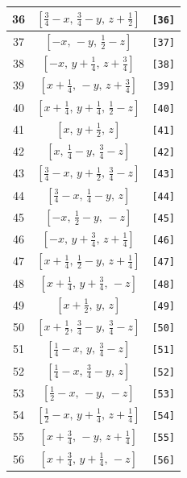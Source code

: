\documentclass[fleqn,8pt]{jsarticle}
\begin{document}
\begin{longtable}{ccc}
36 & $\left[ \frac{3}{4} - x,\, \frac{3}{4} - y,\, z + \frac{1}{2} \right]$ & {\tt [36]} \\ \hline
37 & $\left[ - x,\, - y,\, \frac{1}{2} - z \right]$ & {\tt [37]} \\ \hline
38 & $\left[ - x,\, y + \frac{1}{4},\, z + \frac{3}{4} \right]$ & {\tt [38]} \\ \hline
39 & $\left[ x + \frac{1}{4},\, - y,\, z + \frac{3}{4} \right]$ & {\tt [39]} \\ \hline
40 & $\left[ x + \frac{1}{4},\, y + \frac{1}{4},\, \frac{1}{2} - z \right]$ & {\tt [40]} \\ \hline
41 & $\left[ x,\, y + \frac{1}{2},\, z \right]$ & {\tt [41]} \\ \hline
42 & $\left[ x,\, \frac{1}{4} - y,\, \frac{3}{4} - z \right]$ & {\tt [42]} \\ \hline
43 & $\left[ \frac{3}{4} - x,\, y + \frac{1}{2},\, \frac{3}{4} - z \right]$ & {\tt [43]} \\ \hline
44 & $\left[ \frac{3}{4} - x,\, \frac{1}{4} - y,\, z \right]$ & {\tt [44]} \\ \hline
45 & $\left[ - x,\, \frac{1}{2} - y,\, - z \right]$ & {\tt [45]} \\ \hline
46 & $\left[ - x,\, y + \frac{3}{4},\, z + \frac{1}{4} \right]$ & {\tt [46]} \\ \hline
47 & $\left[ x + \frac{1}{4},\, \frac{1}{2} - y,\, z + \frac{1}{4} \right]$ & {\tt [47]} \\ \hline
48 & $\left[ x + \frac{1}{4},\, y + \frac{3}{4},\, - z \right]$ & {\tt [48]} \\ \hline
49 & $\left[ x + \frac{1}{2},\, y,\, z \right]$ & {\tt [49]} \\ \hline
50 & $\left[ x + \frac{1}{2},\, \frac{3}{4} - y,\, \frac{3}{4} - z \right]$ & {\tt [50]} \\ \hline
51 & $\left[ \frac{1}{4} - x,\, y,\, \frac{3}{4} - z \right]$ & {\tt [51]} \\ \hline
52 & $\left[ \frac{1}{4} - x,\, \frac{3}{4} - y,\, z \right]$ & {\tt [52]} \\ \hline
53 & $\left[ \frac{1}{2} - x,\, - y,\, - z \right]$ & {\tt [53]} \\ \hline
54 & $\left[ \frac{1}{2} - x,\, y + \frac{1}{4},\, z + \frac{1}{4} \right]$ & {\tt [54]} \\ \hline
55 & $\left[ x + \frac{3}{4},\, - y,\, z + \frac{1}{4} \right]$ & {\tt [55]} \\ \hline
56 & $\left[ x + \frac{3}{4},\, y + \frac{1}{4},\, - z \right]$ & {\tt [56]} \\ \hline

\end{longtable}
\end{document}
